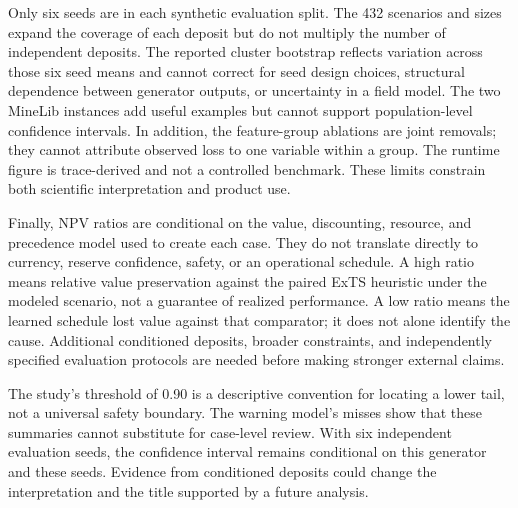 \documentclass[11pt]{article}
\begin{document}
Only six seeds are in each synthetic evaluation split. The 432 scenarios and sizes expand the coverage of each deposit but do not multiply the number of independent deposits. The reported cluster bootstrap reflects variation across those six seed means and cannot correct for seed design choices, structural dependence between generator outputs, or uncertainty in a field model. The two MineLib instances add useful examples but cannot support population-level confidence intervals. In addition, the feature-group ablations are joint removals; they cannot attribute observed loss to one variable within a group. The runtime figure is trace-derived and not a controlled benchmark. These limits constrain both scientific interpretation and product use.

Finally, NPV ratios are conditional on the value, discounting, resource, and precedence model used to create each case. They do not translate directly to currency, reserve confidence, safety, or an operational schedule. A high ratio means relative value preservation against the paired ExTS heuristic under the modeled scenario, not a guarantee of realized performance. A low ratio means the learned schedule lost value against that comparator; it does not alone identify the cause. Additional conditioned deposits, broader constraints, and independently specified evaluation protocols are needed before making stronger external claims.

The study's threshold of 0.90 is a descriptive convention for locating a lower tail, not a universal safety boundary. The warning model's misses show that these summaries cannot substitute for case-level review. With six independent evaluation seeds, the confidence interval remains conditional on this generator and these seeds. Evidence from conditioned deposits could change the interpretation and the title supported by a future analysis.
\end{document}
